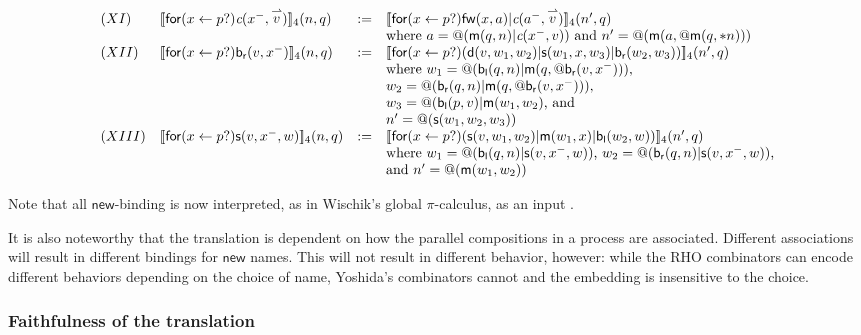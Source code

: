 \documentclass[submission,copyright,creativecommons]{eptcs}
\makeatletter
\newcommand{\new}{\mathsf{new}}
\newcommand{\ldb}{[\![}
\newcommand{\rdb}{]\!]}
\newcommand{\binpar}[2]{#1 | #2}
\newcommand{\prefix}[3]{\mathsf{for}(#2 \leftarrow #1?) #3}
\newcommand{\quotep}[1]{\mathsf{@}#1}
\newcommand{\meaningof}[1]{\ldb #1 \rdb}
\newcommand{\vect}[1]{\stackrel{\rightharpoonup}{#1}}
\theoremstyle{definition}
\theoremstyle{remark}
\theoremstyle{remark}
\makeatother
\begin{document}
\[\begin{array}{llrl}
(XI)&  \meaningof{\prefix{p}{x}{\emph{c}(x^{-},\vect{v})}}_4(n, q) 
    & := & 
    \meaningof{\prefix{p}{x}{\binpar{\mathsf{fw}(x,a)}{\emph{c}(a^{-},\vect{v})}}}_4(n', q)\\
    & & & \mbox{where $a = @(\binpar{\mathsf{m}(q,n)}{\emph{c}(x^{-},v)})$} \mbox{ and $n'= \quotep{(\mathsf{m}(a,\quotep{\mathsf{m}(q,*n)}))}$} \\
(XII)&  \meaningof{\prefix{p}{x}{\mathsf{b}_{\mathsf{r}}(v,x^{-})}}_4(n, q) 
    & := & 
    \meaningof{\prefix{p}{x}{(\binpar{\mathsf{d}(v,w_{1},w_{2})}{\binpar{\mathsf{s}(w_{1},x,w_{3})}{\mathsf{b}_{\mathsf{r}}(w_{2},w_{3})}})}}_{4}(n', q) \\
    & & & \mbox{where $w_{1} = \quotep{(\binpar{\mathsf{b}_{\mathsf{l}}(q,n)}{\mathsf{m}(q,\quotep{\mathsf{b}_{\mathsf{r}}(v,x^{-})})})}$,} \\
    & & & \mbox{$w_{2} = \quotep{(\binpar{\mathsf{b}_{\mathsf{r}}(q,n)}{\mathsf{m}(q,\quotep{\mathsf{b}_{\mathsf{r}}(v,x^{-})})})}$,} \\
    & & & \mbox{$w_{3} = \quotep{(\binpar{\mathsf{b}_{\mathsf{l}}(p,v)}{\mathsf{m}(w_{1},w_{2}})}$, and } \\
    & & & \mbox{$n' = \quotep{(\mathsf{s}(w_{1},w_{2},w_{3}))}$} \\
(XIII)&  \meaningof{\prefix{p}{x}{\mathsf{s}(v,x^{-},w)}}_4(n, q) 
    & := & 
    \meaningof{\prefix{p}{x}{(\binpar{\mathsf{s}(v,w_{1},w_{2})}{\binpar{\mathsf{m}(w_{1},x)}{\mathsf{b}_{\mathsf{l}}(w_{2},w)}})}}_{4}(n', q) \\
    & & & \mbox{where $w_{1} = @(\binpar{\mathsf{b}_{\mathsf{l}}(q,n)}{\mathsf{s}(v,x^{-},w)})$, $w_{2} = @(\binpar{\mathsf{b}_{\mathsf{r}}(q,n)}{\mathsf{s}(v,x^{-},w)})$,} \\
    & & & \mbox{and $n' = \quotep{(\mathsf{m}(w_{1},w_{2}))}$}
\end{array}\]

Note that all $\new$-binding is now interpreted, as in Wischik's
global $\pi$-calculus, as an input \cite{globalpi}.

It is also noteworthy that the translation is dependent on how the
parallel compositions in a process are associated. Different
associations will result in different bindings for $\new$
names. This will not result in different behavior, however:
while the RHO combinators can encode different behaviors depending
on the choice of name, Yoshida's combinators cannot and the
embedding is insensitive to the choice.

\subsubsection{Faithfulness of the translation}
\end{document}
